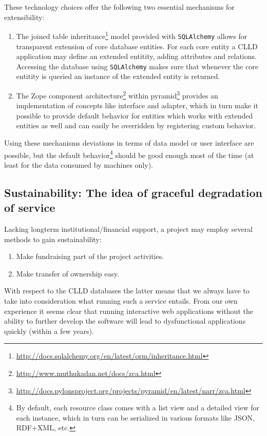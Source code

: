 \documentclass[a4paper,10pt]{article}
\begin{document}
These technology choices offer the following two essential mechanisms for extensibility:
\begin{enumerate}
\item The joined table inheritance\footnote{\url{http://docs.sqlalchemy.org/en/latest/orm/inheritance.html}}
model provided with \texttt{SQLAlchemy} allows for transparent extension of core database entities.
For each core entity a CLLD application may define an extended entitity, adding attributes and relations.
Accessing the database using \texttt{SQLAlchemy} makes sure
that whenever the core entitity is queried an instance of the extended entity is returned.
\item The Zope component architecture\footnote{\url{http://www.muthukadan.net/docs/zca.html}}
within pyramid\footnote{\url{http://docs.pylonsproject.org/projects/pyramid/en/latest/narr/zca.html}}
provides an implementation of concepts like interface and adapter, which in turn make it possible to provide
default behavior for entities which works with extended entities as well and can easily be overridden
by registering custom behavior.
\end{enumerate}

Using these mechanisms deviations in terms of data model or user interface are possible, but the
default behavior\footnote{By default, each resource class comes with a list view and a detailed view
for each instance, which in turn can be serialized in various formats like JSON, RDF+XML, etc.}
should be good enough most of the time (at least for the data consumed by machines only).

\subsection{Sustainability: The idea of graceful degradation of service}
\label{sec:sustainability}
Lacking longterm institutional/financial support, a project may employ several methods to gain sustainability:
\begin{enumerate}
\item Make fundraising part of the project activities.
\item Make transfer of ownership easy.
\end{enumerate}

With respect to the CLLD databases the latter means that we always have to take into
consideration what running such a service entails. From our own experience it seems
clear that running interactive web applications without the ability to further develop
the software will lead to dysfunctional applications quickly (within a few years).
\end{document}
